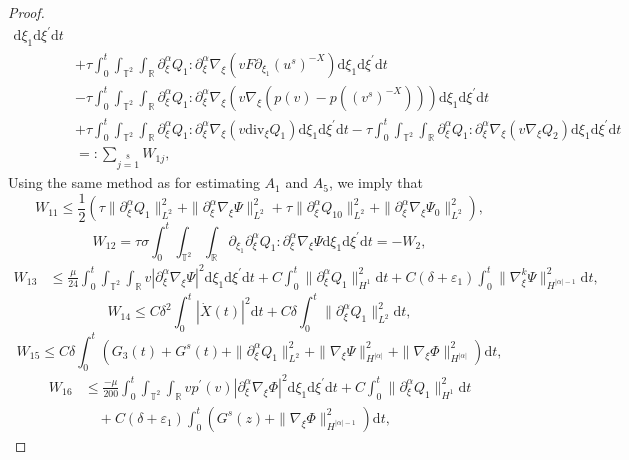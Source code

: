\documentclass[10pt,reqno]{amsart}
\numberwithin{equation}{section}
\newcommand{\dif}{\mathrm{d}}
\newcommand{\ddiv}{\mathrm{div}}
\begin{document}
\begin{proof}
\begin{align*}
    \dif \xi_1\dif \xi^{\prime}\dif t\\
&+\tau\int_0^t\int_{\mathbb{T}^2}\int_{\mathbb{R}}
      \partial_\xi^\alpha Q_1: \partial_\xi^\alpha\nabla_\xi(vF\partial_{\xi_1}(u^s)^{-X})
        \dif \xi_1\dif \xi^{\prime}\dif t\\
&-\tau\int_0^t\int_{\mathbb{T}^2}\int_{\mathbb{R}}
 \partial_\xi^\alpha Q_1: \partial_\xi^\alpha\nabla_\xi(v\nabla_\xi\left(p(v)-p((v^s)^{-X})\right))
    \dif \xi_1\dif \xi^{\prime}\dif t\\
    &+\tau\int_0^t\int_{\mathbb{T}^2}\int_{\mathbb{R}}
      \partial_\xi^\alpha Q_1: \partial_\xi^\alpha\nabla_\xi(v\ddiv_\xi Q_1)
        \dif \xi_1\dif \xi^{\prime}\dif t
-\tau\int_0^t\int_{\mathbb{T}^2}\int_{\mathbb{R}}
  \partial_\xi^\alpha Q_1: \partial_\xi^\alpha\nabla_\xi(v\nabla_\xi Q_2)
    \dif \xi_1\dif \xi^{\prime}\dif t\\
    &=:\sum\limits_{j=1}\limits^8W_{1j},
\end{align*}
Using the same method as for estimating $A_1$ and $A_5$, we imply that
\[
W_{11}\le \frac{1}{2}\left(\tau\|\partial_\xi^\alpha Q_{1}\|_{L^2}^2+\|\partial_\xi^\alpha\nabla_\xi\Psi\|_{L^2}^2
+\tau\|\partial_\xi^\alpha Q_{10}\|_{L^2}^2+\|\partial_\xi^\alpha\nabla_\xi\Psi_0\|_{L^2}^2\right),
\]
\[
W_{12}=\tau\sigma\int_0^t\int_{\mathbb{T}^2}\int_{\mathbb{R}}
\partial_{\xi_1}\partial_\xi^\alpha Q_1
:\partial_\xi^\alpha\nabla_\xi\Psi\dif \xi_1\dif \xi^{\prime}\dif t=-W_2,
\]
\begin{align*}
W_{13}&\le
 \frac{\mu}{24}\int_0^t\int_{\mathbb{T}^2}\int_{\mathbb{R}}v|\partial_\xi^\alpha\nabla_\xi\Psi|^2\dif \xi_1\dif \xi^{\prime}\dif t
+C\int_0^t\|\partial_\xi^\alpha Q_1\|_{H^1}^2\dif t
+C(\delta+\varepsilon_1)\int_0^t\|\nabla^k_\xi \Psi\|_{H^{|\alpha|-1}}^2\dif t,
\end{align*}
\[
W_{14}\le C\delta^2\int_0^t|\dot X(t)|^2\dif t+C\delta\int_0^t\|\partial_\xi^\alpha Q_1\|_{L^2}^2\dif t,
\]
\[
W_{15}\le C\delta\int_0^t\left(G_3(t)+G^s(t)+\|\partial_\xi^\alpha Q_1\|_{L^2}^2
+\|\nabla_\xi\Psi\|_{H^{|\alpha|}}^2+\|\nabla_\xi\Phi\|_{H^{|\alpha|}}^2\right)\dif t,
\]
\begin{align*}
W_{16}&\le \frac{-\mu}{200}\int_0^t\int_{\mathbb{T}^2}\int_{\mathbb{R}}vp^\prime(v)|\partial_\xi^\alpha\nabla_\xi\Phi|^2\dif \xi_1\dif \xi^{\prime}\dif t
    +C\int_0^t\|\partial_\xi^\alpha Q_1\|_{H^1}^2\dif t\\
    &\quad+C(\delta+\varepsilon_1)\int_0^t\left(G^s(z)+\|\nabla_\xi \Phi\|_{H^{|\alpha|-1}}^2\right)\dif t,
  \end{align*}

\end{proof}
\end{document}
